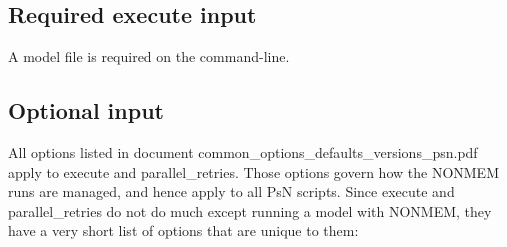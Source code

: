 \subsection{Required execute input}
A model file is required on the command-line.

\subsection{Optional input}
All options listed in document common\_options\_defaults\_versions\_psn.pdf apply to execute and parallel\_retries. 
Those options govern how the NONMEM runs are managed, and hence apply to all PsN scripts.
Since execute and parallel\_retries do not do much except running a model with NONMEM, 
they have a very short list of options that are unique to them:

